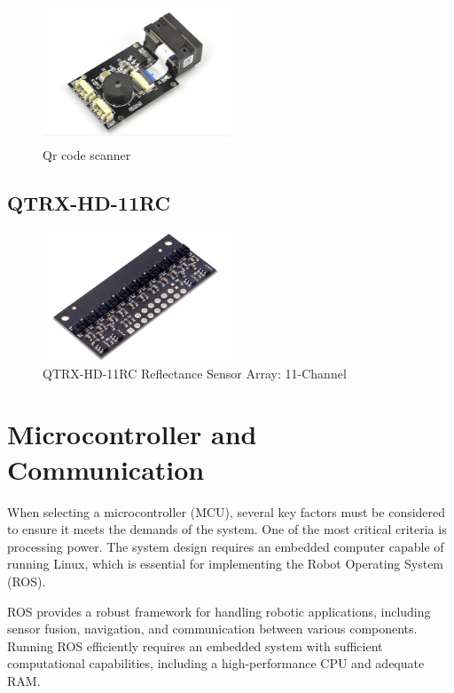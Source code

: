 \documentclass[../../main]{subfiles}
\begin{document}
\begin{figure}[H]
    \centering
    \includegraphics[width=0.5\textwidth]{fig/qr_scanner.png}
    \caption{ Qr code scanner}
    \label{Qr code scanner} %
\end{figure}

\subsection{QTRX-HD-11RC}

\begin{figure}[H]
    \centering
    \includegraphics[width=0.5\textwidth]{fig/array.png}
    \caption{ QTRX-HD-11RC Reflectance Sensor Array: 11-Channel }
    \label{QTRX-HD-11RC Ir Array} %
\end{figure}


\section{Microcontroller and Communication}

When selecting a microcontroller (MCU), several key factors must be 
considered to ensure it meets the demands of the system. One of the 
most critical criteria is processing power. The system design 
requires an embedded computer capable of running Linux, which is 
essential for implementing the Robot Operating System (ROS). 

ROS provides a robust framework for handling robotic applications, 
including sensor fusion, navigation, and communication between 
various components. Running ROS efficiently requires an embedded 
system with sufficient computational capabilities, including a 
high-performance CPU and adequate RAM.
\end{document}
